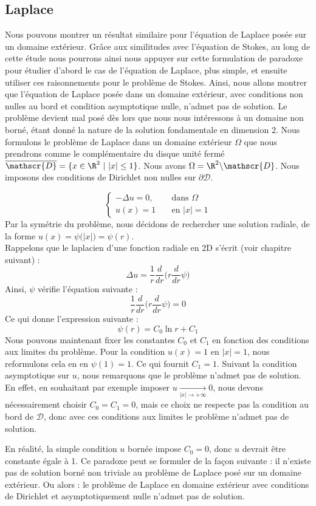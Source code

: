 \subsection{Laplace}

Nous pouvons montrer un résultat similaire pour l'équation de Laplace posée sur un domaine extérieur. Grâce aux similitudes avec l'équation de Stokes, au long de cette étude nous pourrons ainsi nous appuyer sur cette formulation de paradoxe pour étudier d'abord le cas de l'équation de Laplace, plus simple, et ensuite utiliser ces raisonnements pour le problème de Stokes.
Ainsi, nous allons montrer que l'équation de Laplace posée dans un domaine extérieur, avec conditions non nulles au bord et condition asymptotique nulle, n'admet pas de solution. Le problème devient mal posé dès lors que nous nous intéressons à un domaine non borné, étant donné la nature de la solution fondamentale en dimension 2.
Nous formulons le problème de Laplace dans un domaine extérieur $\Omega$ que nous prendrons comme le complémentaire du disque unité fermé $\overline{\mathscr{D}} = \{ x \in \R^2 \ | \ |x| \leq 1 \} $. Nous avons $\Omega = \R^2 \backslash \mathscr{D}$. Nous imposons des conditions de Dirichlet non nulles sur $\partial \mathscr{D}$.

$$\begin{cases}
    - \Delta u = 0, \quad &\text{ dans } \Omega \\
    u(x) = 1 &\text{ en } |x| = 1
\end{cases}$$
Par la symétrie du problème, nous décidons de rechercher une solution radiale, de la forme $u(x) = \psi \big(|x|\big) =  \psi(r)$.\\
Rappelons que le laplacien d'une fonction radiale en 2D s'écrit (voir chapitre suivant) :
$$\Delta u = \frac{1}{r} \frac{d}{dr}\bigg( r \frac{d}{dr}\psi \bigg) $$
Ainsi, $\psi$ vérifie l'équation suivante :
$$ \frac{1}{r} \frac{d}{dr}\bigg( r \frac{d}{dr}\psi \bigg) = 0 $$
Ce qui donne l'expression suivante :
$$ \psi(r) = C_0 \ln r + C_1 $$
Nous pouvons maintenant fixer les constantes $C_0$ et $C_1$ en fonction des conditions aux limites du problème.
Pour la condition $u(x) = 1$ en $|x| = 1$, nous reformulons cela en en $\psi(1) = 1$. Ce qui fournit $C_1 = 1$.
Suivant la condition asymptotique sur $u$, nous remarquons que le problème n'admet pas de solution.
En effet, en souhaitant par exemple imposer $u \xrightarrow[|x| \to +\infty]{} 0$, nous devons nécessairement choisir $C_0 = C_1 = 0$, mais ce choix ne respecte pas la condition au bord de $\mathscr{D}$, donc 
avec ces conditions aux limites le problème n'admet pas de solution.

En réalité, la simple condition $u$ bornée impose $C_0 = 0$, donc $u$ devrait être constante égale à 1.
Ce paradoxe peut se formuler de la façon suivante : il n'existe pas de solution borné non triviale au problème de Laplace posé sur un domaine extérieur. Ou alors : le problème de Laplace en domaine extérieur avec conditions de Dirichlet et asymptotiquement nulle n'admet pas de solution.
